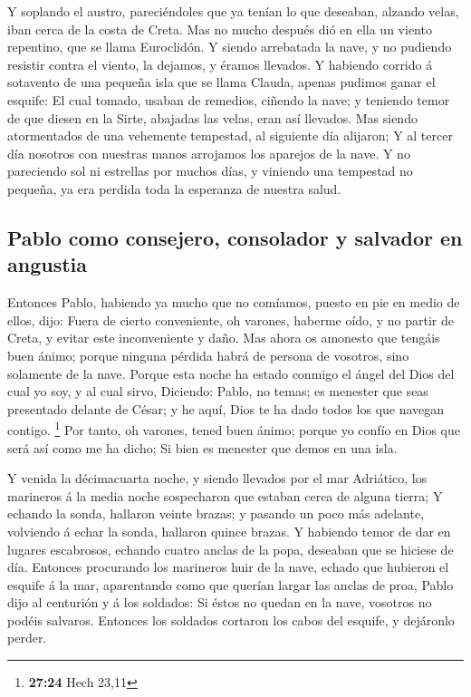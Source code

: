  Y soplando el austro, pareciéndoles que ya tenían lo que
deseaban, alzando velas, iban cerca de la costa de Creta. 
Mas no mucho después dió en ella un viento repentino, que se llama
Euroclidón.  Y siendo arrebatada la nave, y no pudiendo
resistir contra el viento, la dejamos, y éramos llevados. 
Y habiendo corrido á sotavento de una pequeña isla que se llama Clauda,
apenas pudimos ganar el esquife:  El cual tomado, usaban de
remedios, ciñendo la nave; y teniendo temor de que diesen en la Sirte,
abajadas las velas, eran así llevados.  Mas siendo
atormentados de una vehemente tempestad, al siguiente día alijaron;
 Y al tercer día nosotros con nuestras manos arrojamos los
aparejos de la nave.  Y no pareciendo sol ni estrellas por
muchos días, y viniendo una tempestad no pequeña, ya era perdida toda la
esperanza de nuestra salud.

\hypertarget{pablo-como-consejero-consolador-y-salvador-en-angustia}{%
\subsection{Pablo como consejero, consolador y salvador en
angustia}\label{pablo-como-consejero-consolador-y-salvador-en-angustia}}

 Entonces Pablo, habiendo ya mucho que no comíamos, puesto
en pie en medio de ellos, dijo: Fuera de cierto conveniente, oh varones,
haberme oído, y no partir de Creta, y evitar este inconveniente y daño.
 Mas ahora os amonesto que tengáis buen ánimo; porque
ninguna pérdida habrá de persona de vosotros, sino solamente de la nave.
 Porque esta noche ha estado conmigo el ángel del Dios del
cual yo soy, y al cual sirvo,  Diciendo: Pablo, no temas;
es menester que seas presentado delante de César; y he aquí, Dios te ha
dado todos los que navegan contigo. \footnote{\textbf{27:24} Hech 23,11}
 Por tanto, oh varones, tened buen ánimo; porque yo confío
en Dios que será así como me ha dicho;  Si bien es menester
que demos en una isla.

 Y venida la décimacuarta noche, y siendo llevados por el
mar Adriático, los marineros á la media noche sospecharon que estaban
cerca de alguna tierra;  Y echando la sonda, hallaron
veinte brazas; y pasando un poco más adelante, volviendo á echar la
sonda, hallaron quince brazas.  Y habiendo temor de dar en
lugares escabrosos, echando cuatro anclas de la popa, deseaban que se
hiciese de día.  Entonces procurando los marineros huir de
la nave, echado que hubieron el esquife á la mar, aparentando como que
querían largar las anclas de proa,  Pablo dijo al centurión
y á los soldados: Si éstos no quedan en la nave, vosotros no podéis
salvaros.  Entonces los soldados cortaron los cabos del
esquife, y dejáronlo perder.


